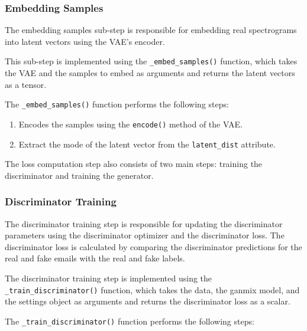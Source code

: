 \subsubsection{Embedding Samples}

The embedding samples sub-step is responsible for embedding real spectrograms into latent vectors using the \ac{VAE}'s encoder.

This sub-step is implemented using the \texttt{\_embed\_samples()} function, which takes the \ac{VAE} and the samples to embed as arguments and returns the latent vectors as a tensor.

The \texttt{\_embed\_samples()} function performs the following steps:

\begin{enumerate}
    \item Encodes the samples using the \texttt{encode()} method of the \ac{VAE}.
    \item Extract the mode of the latent vector from the \texttt{latent\_dist} attribute.
\end{enumerate}

The loss computation step also consists of two main steps: training the discriminator and training the generator.

\subsubsection{Discriminator Training}

The discriminator training step is responsible for updating the discriminator parameters using the discriminator optimizer and the discriminator loss. The discriminator loss is calculated by comparing the discriminator predictions for the real and fake emails with the real and fake labels.

The discriminator training step is implemented using the \texttt{\_train\_discriminator()} function, which takes the data, the ganmix model, and the settings object as arguments and returns the discriminator loss as a scalar.

The \texttt{\_train\_discriminator()} function performs the following steps:

